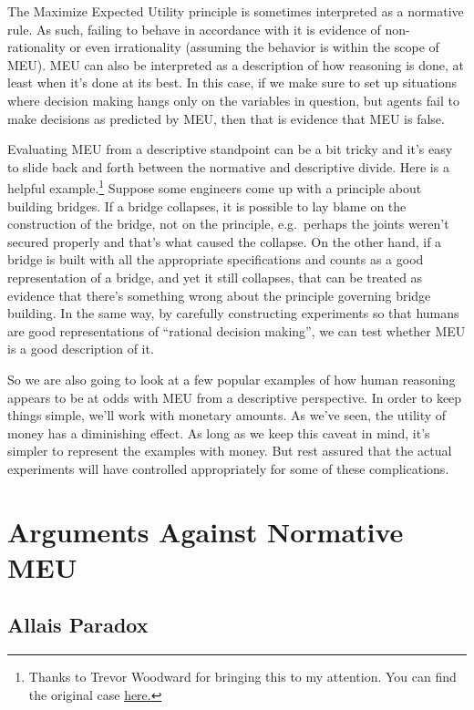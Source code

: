 \documentclass[]{tufte-book}
\begin{document}
The Maximize Expected Utility principle is sometimes interpreted as a normative rule. As such, failing to behave in accordance with it is evidence of non-rationality or even irrationality (assuming the behavior is within the scope of MEU). MEU can also be interpreted as a description of how reasoning is done, at least when it's done at its best. In this case, if we make sure to set up situations where decision making hangs only on the variables in question, but agents fail to make decisions as predicted by MEU, then that is evidence that MEU is false.

Evaluating MEU from a descriptive standpoint can be a bit tricky and it's easy to slide back and forth between the normative and descriptive divide. Here is a helpful example.\footnote{Thanks to Trevor Woodward for bringing this to my attention. You can find the original case \href{https://interestingengineering.com/understanding-hyatt-regency-walkway-collapse}{here.}} Suppose some engineers come up with a principle about building bridges. If a bridge collapses, it is possible to lay blame on the construction of the bridge, not on the principle, e.g.~perhaps the joints weren't secured properly and that's what caused the collapse. On the other hand, if a bridge is built with all the appropriate specifications and counts as a good representation of a bridge, and yet it still collapses, that can be treated as evidence that there's something wrong about the principle governing bridge building. In the same way, by carefully constructing experiments so that humans are good representations of ``rational decision making'', we can test whether MEU is a good description of it.

So we are also going to look at a few popular examples of how human reasoning appears to be at odds with MEU from a descriptive perspective. In order to keep things simple, we'll work with monetary amounts. As we've seen, the utility of money has a diminishing effect. As long as we keep this caveat in mind, it's simpler to represent the examples with money. But rest assured that the actual experiments will have controlled appropriately for some of these complications.

\hypertarget{arguments-against-normative-meu}{%
\section{Arguments Against Normative MEU}\label{arguments-against-normative-meu}}

\hypertarget{allais-paradox}{%
\subsection{Allais Paradox}\label{allais-paradox}}
\end{document}
